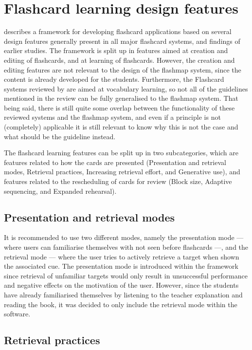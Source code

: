     \section{Flashcard learning design features}

 describes a framework for developing flashcard applications based on several design features generally present in all major flashcard systems, and findings of earlier studies. The framework is split up in features aimed at creation and editing of flashcards, and at learning of flashcards. However, the creation and editing features are not relevant to the design of the flashmap system, since the content is already developed for the students. Furthermore, the Flashcard systems reviewed by  are aimed at vocabulary learning, so not all of the guidelines mentioned in the review can be fully generalised to the flashmap system. That being said, there is still quite some overlap between the functionality of these reviewed systems and the flashmap system, and even if a principle is not (completely) applicable it is still relevant to know why this is not the case and what should be the guideline instead.

The flashcard learning features can be split up in two subcategories, which are features related to how the cards are presented (Presentation and retrieval modes, Retrieval practices, Increasing retrieval effort, and Generative use), and features related to the rescheduling of cards for review (Block size, Adaptive sequencing, and Expanded rehearsal).

        \subsection{Presentation and retrieval modes}

It is recommended to use two different modes, namely the presentation mode --- where users can familiarise themselves with not seen before flashcards ---, and the retrieval mode --- where the user tries to actively retrieve a target when shown the associated cue. The presentation mode is introduced within the framework since retrieval of unfamiliar targets would only result in unsuccessful performance and negative effects on the motivation of the user. However, since the students have already familiarised themselves by listening to the teacher explanation and reading the book, it was decided to only include the retrieval mode within the software.

        \subsection{Retrieval practices}

